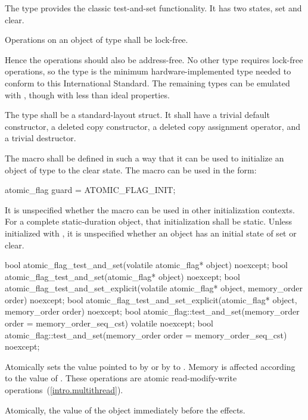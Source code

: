 \pnum
The  type provides the classic test-and-set functionality. It has two states, set and clear.

\pnum
Operations on an object of type  shall be lock-free. \begin{note} Hence
the operations should also be address-free. No other type requires lock-free operations,
so the  type is the minimum hardware-implemented type needed to
conform to this International Standard. The remaining types can be emulated with
, though with less than ideal properties. \end{note}

\pnum
The  type shall be a standard-layout struct.
It shall have a trivial default constructor, a deleted copy constructor, a deleted copy assignment operator, and a trivial destructor.

\pnum
The macro  shall be defined in such a way that it can be used to initialize an object of type  to the
clear state. The macro can be used in the form:
\begin{codeblock}
atomic_flag guard = ATOMIC_FLAG_INIT;
\end{codeblock}
It is unspecified whether the macro can be used in other initialization contexts.
For a complete static-duration object, that initialization shall be static.
Unless initialized with , it is unspecified whether an
 object has an initial state of set or clear.

%
%
%
\begin{itemdecl}
bool atomic_flag_test_and_set(volatile atomic_flag* object) noexcept;
bool atomic_flag_test_and_set(atomic_flag* object) noexcept;
bool atomic_flag_test_and_set_explicit(volatile atomic_flag* object, memory_order order) noexcept;
bool atomic_flag_test_and_set_explicit(atomic_flag* object, memory_order order) noexcept;
bool atomic_flag::test_and_set(memory_order order = memory_order_seq_cst) volatile noexcept;
bool atomic_flag::test_and_set(memory_order order = memory_order_seq_cst) noexcept;
\end{itemdecl}

\begin{itemdescr}
\pnum
\effects Atomically sets the value pointed to by  or by  to . Memory is affected according to the value of
. These operations are atomic read-modify-write operations~(\ref{intro.multithread}).

\pnum
\returns Atomically, the value of the object immediately before the effects.
\end{itemdescr}

